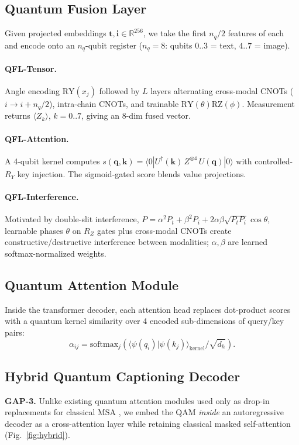 \documentclass[11pt]{article}
\begin{document}
\subsection{Quantum Fusion Layer}
\label{sec:qfl}
Given projected embeddings $\mathbf{t}, \mathbf{i} \in \mathbb{R}^{256}$, we
take the first $n_q/2$ features of each and encode onto an $n_q$-qubit register
($n_q{=}8$: qubits $0..3$ = text, $4..7$ = image).

\paragraph{QFL-Tensor.}
Angle encoding $\mathrm{RY}(x_j)$ followed by $L$ layers alternating
cross-modal CNOTs ($i \to i + n_q/2$), intra-chain CNOTs, and trainable
$\mathrm{RY}(\theta)\mathrm{RZ}(\phi)$. Measurement returns
$\langle Z_k \rangle$, $k = 0..7$, giving an 8-dim fused vector.

\paragraph{QFL-Attention.}
A 4-qubit kernel computes
$s(\mathbf{q}, \mathbf{k}) =
\langle 0 | U^\dagger(\mathbf{k})\, Z^{\otimes 4}\, U(\mathbf{q}) | 0\rangle$
with controlled-$R_Y$ key injection. The sigmoid-gated score blends value
projections.

\paragraph{QFL-Interference.}
Motivated by double-slit interference,
$P = \alpha^2 P_t + \beta^2 P_i + 2\alpha\beta\sqrt{P_t P_i}\cos\theta$,
learnable phases $\theta$ on $R_Z$ gates plus cross-modal CNOTs create
constructive/destructive interference between modalities; $\alpha,\beta$ are
learned softmax-normalized weights.

\subsection{Quantum Attention Module}
\label{sec:qam}
Inside the transformer decoder, each attention head replaces dot-product
scores with a quantum kernel similarity over 4 encoded sub-dimensions of
query/key pairs:
\begin{equation}
\alpha_{ij} = \mathrm{softmax}_j\!\left(
  \langle \psi(q_i) | \psi(k_j) \rangle_{\mathrm{kernel}} / \sqrt{d_h}\right).
\end{equation}

\subsection{Hybrid Quantum Captioning Decoder}
\label{sec:hybrid_decoder}
\textbf{GAP-3.}
Unlike existing quantum attention modules used only as drop-in replacements
for classical MSA \citep{tomal2025qattn, yadla2025vqc}, we embed the QAM
\emph{inside} an autoregressive decoder as a cross-attention layer while
retaining classical masked self-attention (Fig.~\ref{fig:hybrid}).
\end{document}
